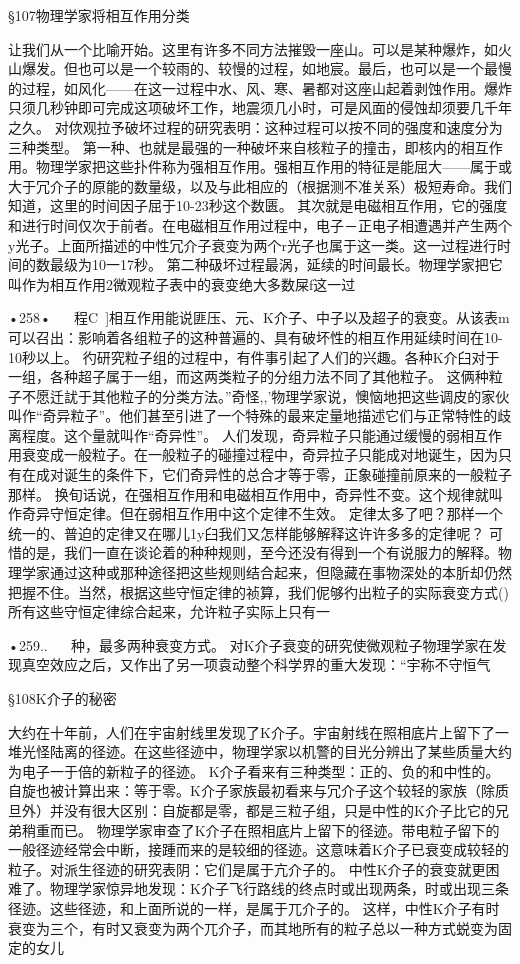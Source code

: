 §107物理学家将相互作用分类

让我们从一个比喻开始。这里有许多不同方法摧毁一座山。可以是某种爆炸，如火山爆发。但也可以是一个较雨的、较慢的过程，如地宸。最后，也可以是一个最慢的过程，如风化——在这一过程中水、风、寒、暑都对这座山起着剥蚀作用。爆炸只须几秒钟即可完成这项破坏工作，地震须几小时，可是风面的侵蚀却须要几千年之久。
对佽观拉予破坏过程的研究表明：这种过程可以按不同的强度和速度分为三种类型。
第一种、也就是最强的一种破坏来自核粒子的撞击，即核内的相互作用。物理学家把这些扑件称为强相互作用。强相互作用的特征是能屈大——属于或大于冗介子的原能的数量级，以及与此相应的（根据测不准关系）极短寿命。我们知道，这里的时间因子屈于10-23秒这个数匮。
其次就是电磁相互作用，它的强度和进行时间仅次于前者。在电磁相互作用过程中，电子－正电子相遭遇并产生两个y光子。上面所描述的中性冗介子衰变为两个r光子也属于这一类。这一过程进行时间的数最级为10一17秒。
第二种砐坏过程最涡，延续的时间最长。物理学家把它叫作为相互作用2微观粒子表中的衰变绝大多数屎f这一过

•258•
  
程C~]相互作用能说匪压、元、K介子、中子以及超子的衰变。从该表m可以召出：影响着各组粒子的这种普遍的、具有破坏性的相互作用延续时间在10-10秒以上。
彴研究粒子组的过程中，有件事引起了人们的兴趣。各种K介臼对于一组，各种超子属于一组，而这两类粒子的分组力法不同了其他粒子。
这俩种粒子不愿迁訧于其他粒子的分类方法。”奇怪,,'物理学家说，懊恼地把这些调皮的家伙叫作“奇异粒子”。他们甚至引进了一个特殊的最来定量地描述它们与正常特性的歧离程度。这个量就叫作“奇异性”。
人们发现，奇异粒子只能通过缓慢的弱相互作用衰变成一般粒子。在一般粒子的碰撞过程中，奇异拉子只能成对地诞生，因为只有在成对诞生的条件下，它们奇异性的总合才等于零，正象碰撞前原来的一般粒子那样。
换旬话说，在强相互作用和电磁相互作用中，奇异性不变。这个规律就叫作奇异守恒定律。但在弱相互作用中这个定律不生效。
定律太多了吧？那样一个统一的、普迫的定律又在哪儿1y臼我们又怎样能够解释这许许多多的定律呢？
可惜的是，我们一直在谈论着的种种规则，至今还没有得到一个有说服力的解释。物理学家通过这种或那种途径把这些规则结合起来，但隐藏在事物深处的本肵却仍然把握不住。当然，根据这些守恒定律的祯算，我们伲够彴出粒子的实际衰变方式()所有这些守恒定律综合起来，允许粒子实际上只有一

•259..
  
种，最多两种衰变方式。
对K介子衰变的研究使微观粒子物理学家在发现真空效应之后，又作出了另一项袁动整个科学界的重大发现：“宇称不守恒气

§108K介子的秘密

大约在十年前，人们在宇宙射线里发现了K介子。宇宙射线在照相底片上留下了一堆光怪陆离的径迹。在这些径迹中，物理学家以机警的目光分辨出了某些质量大约为电子一于倍的新粒子的径迹。
K介子看来有三种类型：正的、负的和中性的。自旋也被计算出来：等于零。K介子家族最初看来与冗介子这个较轻的家族（除质旦外）并没有很大区别：自旋都是零，都是三粒子组，只是中性的K介子比它的兄弟稍重而已。
物理学家审查了K介子在照相底片上留下的径迹。带电粒子留下的一般径迹经常会中断，接踵而来的是较细的径迹。这意味着K介子已衰变成较轻的粒子。对派生径迹的研究表阴：它们是属于亢介子的。
中性K介子的衰变就更困难了。物理学家惊异地发现：K介子飞行路线的终点时或出现两条，时或出现三条径迹。这些径迹，和上面所说的一样，是属于兀介子的。
这样，中性K介子有时衰变为三个，有时又衰变为两个兀介子，而其地所有的粒子总以一种方式蜕变为固定的女儿

